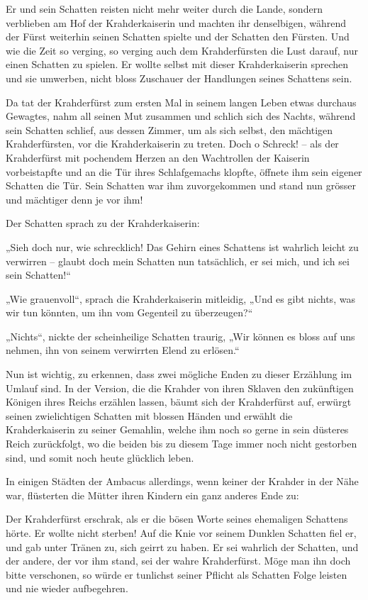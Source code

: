 \documentclass[10pt, a4paper, oneside]{book}
\begin{document}
Er und sein Schatten reisten nicht mehr weiter durch die Lande, sondern verblieben am Hof der Krahderkaiserin und machten ihr denselbigen, während der Fürst weiterhin seinen Schatten spielte und der Schatten den Fürsten. Und wie die Zeit so verging, so verging auch dem Krahderfürsten die Lust darauf, nur einen Schatten zu spielen. Er wollte selbst mit dieser Krahderkaiserin sprechen und sie umwerben, nicht bloss Zuschauer der Handlungen seines Schattens sein.

Da tat der Krahderfürst zum ersten Mal in seinem langen Leben etwas durchaus Gewagtes, nahm all seinen Mut zusammen und schlich sich des Nachts, während sein Schatten schlief, aus dessen Zimmer, um als sich selbst, den mächtigen Krahderfürsten, vor die Krahderkaiserin zu treten. Doch o Schreck! – als der Krahderfürst mit pochendem Herzen an den Wachtrollen der Kaiserin vorbeistapfte und an die Tür ihres Schlafgemachs klopfte, öffnete ihm sein eigener Schatten die Tür. Sein Schatten war ihm zuvorgekommen und stand nun grösser und mächtiger denn je vor ihm!

Der Schatten sprach zu der Krahderkaiserin:

„Sieh doch nur, wie schrecklich! Das Gehirn eines Schattens ist wahrlich leicht zu verwirren – glaubt doch mein Schatten nun tatsächlich, er sei mich, und ich sei sein Schatten!“

„Wie grauenvoll“, sprach die Krahderkaiserin mitleidig, „Und es gibt nichts, was wir tun könnten, um ihn vom Gegenteil zu überzeugen?“

„Nichts“, nickte der scheinheilige Schatten traurig, „Wir können es bloss auf uns nehmen, ihn von seinem verwirrten Elend zu erlösen.“\bigskip



Nun ist wichtig, zu erkennen, dass zwei mögliche Enden zu dieser Erzählung im Umlauf sind. In der Version, die die Krahder von ihren Sklaven den zukünftigen Königen ihres Reichs erzählen lassen, bäumt sich der Krahderfürst auf, erwürgt seinen zwielichtigen Schatten mit blossen Händen und erwählt die Krahderkaiserin zu seiner Gemahlin, welche ihm noch so gerne in sein düsteres Reich zurückfolgt, wo die beiden bis zu diesem Tage immer noch nicht gestorben sind, und somit noch heute glücklich leben.

In einigen Städten der Ambacus allerdings, wenn keiner der Krahder in der Nähe war, flüsterten die Mütter ihren Kindern ein ganz anderes Ende zu:\bigskip



Der Krahderfürst erschrak, als er die bösen Worte seines ehemaligen Schattens hörte. Er wollte nicht sterben! Auf die Knie vor seinem Dunklen Schatten fiel er, und gab unter Tränen zu, sich geirrt zu haben. Er sei wahrlich der Schatten, und der andere, der vor ihm stand, sei der wahre Krahderfürst. Möge man ihn doch bitte verschonen, so würde er tunlichst seiner Pflicht als Schatten Folge leisten und nie wieder aufbegehren.
\end{document}
